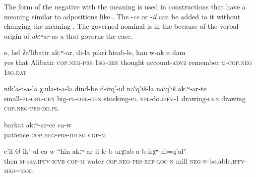 The  form of the negative  with the meaning  is used in constructions that have a meaning similar to adpositions like . The  -\textit{ce} or -\textit{il} can be added to it without changing the meaning . The governed nominal is in the  because of the verbal origin of \textit{akːʷar} as a  that governs the  case.
%
\begin{exe}
	\ex
	\begin{xlist}
		\ex	\label{Yes, except Alibatir, in my mind, I do not remember}
		\gll	e,	hel	ʡaˁlibatir	akːʷ-ar,	di-la	pikri	ħisab-le,	han	w-akːu	dam   \\
			yes	that	Alibatir	\textsc{cop.neg}-\textsc{prs}	1\textsc{sg}-\textsc{gen}	thought	account-\textsc{advz}	remember	\textsc{m}-\textsc{cop.neg}	1\textsc{sg.}\textsc{dat}\\
		\glt	{}

		\ex	\label{For children, for adults we make stockings, those with a drawing, those without a drawing}
		\gll	nik'a-t-a-la	χːula-t-a-la	dind-be	d-irq'-id	naˁq'iš-la	naˁq'iš	akːʷ-ar-te \\
			small-\textsc{pl}-\textsc{obl}-\textsc{gen}	big-\textsc{pl}-\textsc{obl}-\textsc{gen}	stocking-\textsc{pl}	\textsc{npl}-do.\textsc{ipfv}-1	drawing-\textsc{gen} drawing	\textsc{cop.neg}-\textsc{prs}-\textsc{dd.pl }\\
		\glt	{}

		\ex	\label{(He) lacks patience}
		\gll	barkat	akːʷ-ar-ce	ca-w  \\
			patience	\textsc{cop.neg}-\textsc{prs}-\textsc{dd}.\textsc{sg}	\textsc{cop-m}\\
		\glt	{}

		\ex	\label{‎‎He said, there where is no water a mill cannot be}
		\gll	c'il	Ø-ik'-ul ca-w		``hin	akːʷ-ar-il-le-b	urχːab	a-b-irχʷ-ni=q'al''  \\
			then	\textsc{m}-say.\textsc{ipfv}-\textsc{icvb} \textsc{cop-m} water \textsc{cop.neg}-\textsc{prs}-\textsc{ref}-\textsc{loc}-\textsc{n}	mill	\textsc{neg}-\textsc{n}-be.able.\textsc{ipfv}-\textsc{msd}=\textsc{mod}\\
		\glt	{}
	\end{xlist}
\end{exe}


